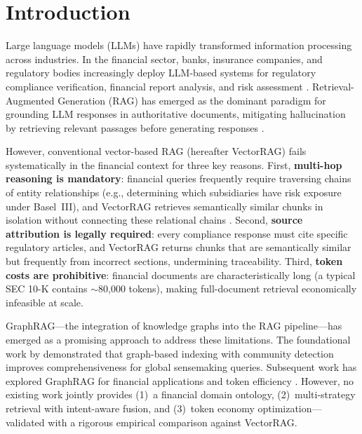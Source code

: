 \documentclass[review]{elsarticle}
\begin{document}
\section{Introduction}
\label{sec:introduction}

Large language models (LLMs) have rapidly transformed information processing across industries. In the financial sector, banks, insurance companies, and regulatory bodies increasingly deploy LLM-based systems for regulatory compliance verification, financial report analysis, and risk assessment \citep{pwc2024graphllm}. Retrieval-Augmented Generation (RAG) has emerged as the dominant paradigm for grounding LLM responses in authoritative documents, mitigating hallucination by retrieving relevant passages before generating responses \citep{lewis2020rag}.

However, conventional vector-based RAG (hereafter VectorRAG) fails systematically in the financial context for three key reasons. First, \textbf{multi-hop reasoning is mandatory}: financial queries frequently require traversing chains of entity relationships (e.g., determining which subsidiaries have risk exposure under Basel~III), and VectorRAG retrieves semantically similar chunks in isolation without connecting these relational chains \citep{han2025ragvsgraphrag}. Second, \textbf{source attribution is legally required}: every compliance response must cite specific regulatory articles, and VectorRAG returns chunks that are semantically similar but frequently from incorrect sections, undermining traceability. Third, \textbf{token costs are prohibitive}: financial documents are characteristically long (a typical SEC 10-K contains $\sim$80,000 tokens), making full-document retrieval economically infeasible at scale.

GraphRAG---the integration of knowledge graphs into the RAG pipeline---has emerged as a promising approach to address these limitations. The foundational work by \citet{edge2024graphrag} demonstrated that graph-based indexing with community detection improves comprehensiveness for global sensemaking queries. Subsequent work has explored GraphRAG for financial applications \citep{sarmah2024hybridrag, arun2025finreflectkg, graphcompliance2025} and token efficiency \citep{terag2025, lazygraphrag2025, polyg2025}. However, no existing work jointly provides (1)~a financial domain ontology, (2)~multi-strategy retrieval with intent-aware fusion, and (3)~token economy optimization---validated with a rigorous empirical comparison against VectorRAG.
\end{document}
